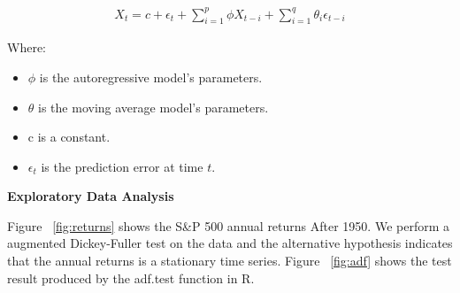 \documentclass{article}
\begin{document}
\begin{align*}
    X_t=c+\epsilon_t+\sum_{i=1}^p\phi X_{t-i}+\sum_{i=1}^q\theta_i\epsilon_{t-i}
\end{align*}

Where:
\begin{itemize}
    \item $\phi$ is the autoregressive model's parameters.
    \item $\theta$ is the moving average model's parameters.
    \item c is a constant.
    \item $\epsilon_t$ is the prediction error at time $t$.
\end{itemize}

\textbf{Exploratory Data Analysis}

Figure ~\ref{fig:returns} shows the S\&P 500 annual returns After 1950. We perform a augmented Dickey-Fuller test on the data and the alternative hypothesis indicates that the annual returns is a stationary time series. Figure ~\ref{fig:adf} shows the test result produced by the adf.test function in R.
\end{document}

